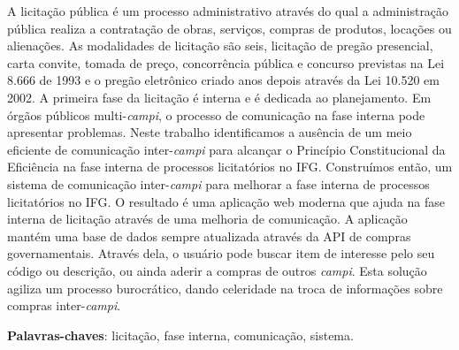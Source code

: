 \begin{resumo}
 A licitação pública é um processo administrativo através do qual a administração pública realiza a contratação de obras, serviços, compras de produtos, locações ou alienações.
 As modalidades de licitação são seis, licitação de pregão presencial, carta convite, tomada de preço, concorrência pública e concurso previstas na Lei 8.666 de 1993 e o pregão eletrônico criado anos depois através da Lei 10.520 em 2002.
 A primeira fase da licitação é interna e é dedicada ao planejamento.
 Em órgãos públicos multi-\textit{campi}, o processo de comunicação na fase interna pode apresentar problemas.
 Neste trabalho identificamos a ausência de um meio eficiente de comunicação inter-\textit{campi} para alcançar o Princípio Constitucional da Eficiência na fase interna de processos licitatórios no IFG.
 Construímos então, um sistema de comunicação inter-\textit{campi} para melhorar a fase interna de processos licitatórios no IFG.
 O resultado é uma aplicação web moderna que ajuda na fase interna de licitação através de uma melhoria de comunicação.
 A aplicação mantém uma base de dados sempre atualizada através da API de compras governamentais.
 Através dela, o usuário pode buscar item de interesse pelo seu código ou descrição, ou ainda aderir a compras de outros \textit{campi}.
 Esta solução agiliza um processo burocrático, dando celeridade na troca de informações sobre compras inter-\textit{campi}.
 \vspace{\onelineskip}
    
 \noindent
 \textbf{Palavras-chaves}: licitação, fase interna, comunicação, sistema.
\end{resumo}
